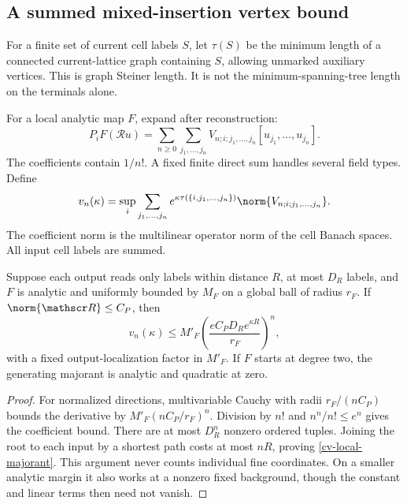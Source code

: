 \subsection{A summed mixed-insertion vertex bound}
\label{cv-vertex-section}

For a finite set of current cell labels $S$, let $\tau(S)$ be
the minimum length of a connected current-lattice graph
containing $S$, allowing unmarked auxiliary vertices. This is
graph Steiner length. It is not the minimum-spanning-tree
length on the terminals alone.

For a local analytic map $F$, expand after reconstruction:
\begin{equation}\label{cv-vertex-expansion}
 P_iF(\mathscr Ru)=
 \sum_{n\ge0}\sum_{j_1,\ldots,j_n}
 V_{n;i;j_1,\ldots,j_n}[u_{j_1},\ldots,u_{j_n}].
\end{equation}
The coefficients contain $1/n!$. A fixed finite direct sum
handles several field types. Define
\begin{equation}\label{cv-vertex-norm}
 v_n(\kappa)=\sup_i\sum_{j_1,\ldots,j_n}
 e^{\kappa\tau(\{i,j_1,\ldots,j_n\})}
             \norm{V_{n;i;j_1,\ldots,j_n}}.
\end{equation}
The coefficient norm is the multilinear operator norm of
the cell Banach spaces. All input cell labels are summed.

\begin{lemma}\label{cv-local-lemma}
Suppose each output reads only labels within distance $R$,
at most $D_R$ labels, and $F$ is analytic and uniformly
bounded by $M_F$ on a global ball of radius $r_F$. If
$\norm{\mathscr R}\le C_P$, then
\begin{equation}\label{cv-local-majorant}
 v_n(\kappa)\le M'_F
       \left(\frac{eC_PD_Re^{\kappa R}}{r_F}\right)^n,
\end{equation}
with a fixed output-localization factor in $M'_F$.
If $F$ starts at degree two, the generating majorant is
analytic and quadratic at zero.
\end{lemma}

\begin{proof}
For normalized directions, multivariable Cauchy with radii
$r_F/(nC_P)$ bounds the derivative by
$M'_F(nC_P/r_F)^n$. Division by $n!$ and
$n^n/n!\le e^n$ gives the coefficient bound. There are at
most $D_R^n$ nonzero ordered tuples. Joining the root to
each input by a shortest path costs at most $nR$, proving
\eqref{cv-local-majorant}. This argument never counts
individual fine coordinates. On a smaller analytic margin
it also works at a nonzero fixed background, though the
constant and linear terms then need not vanish.
\end{proof}

